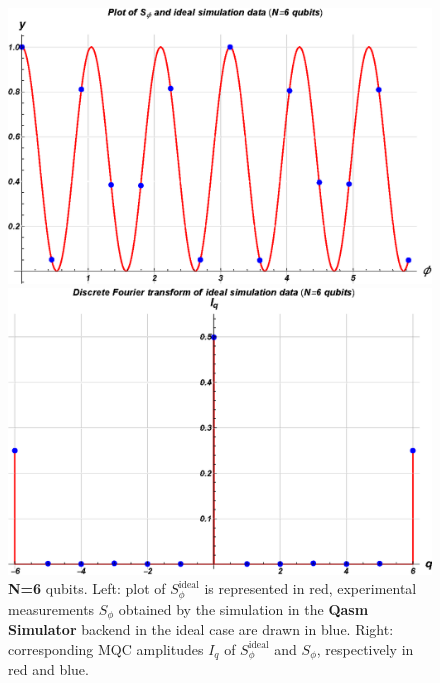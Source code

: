 \vspace{0.3cm}

\begin{figure}[h!]
\begin{minipage}[c]{0.5\linewidth}
\hspace{1cm}
\centering \includegraphics[width=1\textwidth]{./chapter3/graphics_IBM/simulation/6S.eps}
\end{minipage}
\begin{minipage}[]{0.5\linewidth}
\centering \includegraphics[width=1\textwidth]{./chapter3/graphics_IBM/simulation/6I.eps}
\end{minipage}
\caption{\label{IdealSimulation6} \textbf{N=6} qubits. Left:  plot of $S_{\phi}^{\text{ideal}}$ is represented in red, experimental measurements $S_{\phi}$ obtained by the simulation in the \textbf{Qasm Simulator} backend in the ideal case are drawn in blue. Right: corresponding MQC amplitudes $I_q$ of $S_\phi^{\text{ideal}}$ and $S_\phi$, respectively in red and blue.}
\end{figure}


